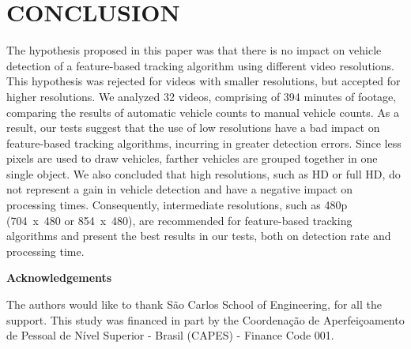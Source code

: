 \documentclass[article,12pt,a4paper,oneside,hidelinks]{memoir}
\begin{document}
\section{CONCLUSION}
The hypothesis proposed in this paper was that there is no impact on vehicle detection of a feature-based tracking algorithm using different video resolutions. This hypothesis was rejected for videos with smaller resolutions, but accepted for higher resolutions. We analyzed 32 videos, comprising of 394 minutes of footage, comparing the results of automatic vehicle counts to manual vehicle counts. As a result, our tests suggest that the use of low resolutions have a bad impact on feature-based tracking algorithms, incurring in greater detection errors. Since less pixels are used to draw vehicles, farther vehicles are grouped together in one single object. We also concluded that high resolutions, such as HD or full HD, do not represent a gain in vehicle detection and have a negative impact on processing times. Consequently, intermediate resolutions, such as 480p (704~x~480 or 854~x~480), are recommended for feature-based tracking algorithms and present the best results in our tests, both on detection rate and processing time.

\begin{footnotesize}
	\footnotesize{\textbf{Acknowledgements}}
	\setlength{\parskip}{0pt} \par
	\footnotesize
	\begin{SingleSpace}
		The authors would like to thank São Carlos School of Engineering, for all the support. This study was financed in part by the Coordenação de Aperfeiçoamento de Pessoal de Nível Superior - Brasil (CAPES) - Finance Code 001.		
		\setlength{\parskip}{12pt}
	\end{SingleSpace}
\end{footnotesize}




\renewcommand{\bibsection}{
	\setsecheadstyle{\bfseries \footnotesize \uppercase}
	{\section*{References}}}
\renewcommand{\bibfont}{\footnotesize}
%

\setlength{\bibsep}{0pt}        %
\end{document}
